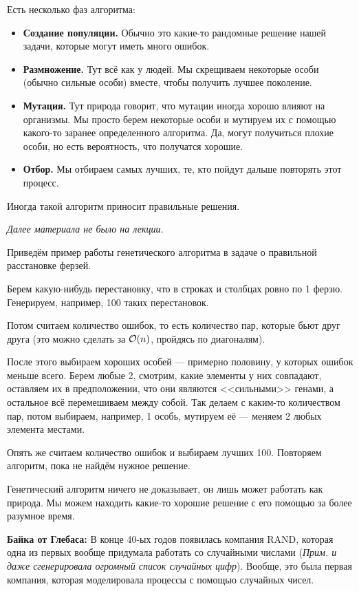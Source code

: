 \documentclass[a4paper, 12pt]{article}
\begin{document}
Есть несколько фаз алгоритма:

\begin{itemize}
  \item {\bf Создание популяции.} Обычно это какие-то рандомные решение нашей 
  задачи, которые могут иметь много ошибок.
  \item {\bf Размножение.} Тут всё как у людей. Мы скрещиваем некоторые особи 
  (обычно сильные особи) вместе, чтобы получить лучшее поколение.
  \item {\bf Мутация.} Тут природа говорит, что мутации иногда хорошо влияют
  на организмы. Мы просто берем некоторые особи и мутируем их с помощью
  какого-то заранее определенного алгоритма. Да, могут получиться плохие
  особи, но есть вероятность, что получатся хорошие.
  \item {\bf Отбор.} Мы отбираем самых лучших, те, кто пойдут дальше повторять
  этот процесс.
\end{itemize}

Иногда такой алгоритм приносит правильные решения. 

{\it Далее материала не было на лекции.}

Приведём пример работы генетического алгоритма в задаче о правильной
расстановке ферзей.

Берем какую-нибудь перестановку, что в строках и столбцах ровно по 1 ферзю.
Генерируем, например, 100 таких перестановок.

Потом считаем количество ошибок, то есть количество пар, которые бьют друг
друга (это можно сделать за $\mathcal{O}(n)$, пройдясь по диагоналям).

После этого выбираем хороших особей --- примерно половину, у которых ошибок
меньше всего. Берем любые 2, смотрим, какие элементы у них совпадают, оставляем
их в предположении, что они являются <<сильными>> генами, а остальное всё
перемешиваем между собой. Так делаем с каким-то количеством пар, потом
выбираем, например, 1 особь, мутируем её --- меняем 2 любых элемента местами.

Опять же считаем количество ошибок и выбираем лучших 100. Повторяем алгоритм,
пока не найдём нужное решение.

Генетический алгоритм ничего не доказывает, он лишь может работать как природа.
Мы можем находить какие-то хорошие решение с его помощью за более разумное время.

{\bf Байка от Глебаса:}
  В конце 40-ых годов появилась компания RAND, которая одна из первых вообще
  придумала работать со случайными числами ({\it Прим. и даже сгенерировала 
  огромный список случайных цифр}). Вообще, это была первая компания, которая
  моделировала процессы с помощью случайных чисел.
\end{document}
